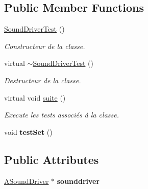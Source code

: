 \subsection*{Public Member Functions}
\begin{DoxyCompactItemize}
\item 
\mbox{\label{classtest_1_1SoundDriverTest_aad88a1409390d4e5683f01c8148cd678}} 
\hyperlink{classtest_1_1SoundDriverTest_aad88a1409390d4e5683f01c8148cd678}{Sound\+Driver\+Test} ()
\begin{DoxyCompactList}\small\item\em Constructeur de la classe. \end{DoxyCompactList}\item 
\mbox{\label{classtest_1_1SoundDriverTest_aa24bf777b917a63c718943de6adc0862}} 
virtual \hyperlink{classtest_1_1SoundDriverTest_aa24bf777b917a63c718943de6adc0862}{$\sim$\+Sound\+Driver\+Test} ()
\begin{DoxyCompactList}\small\item\em Destructeur de la classe. \end{DoxyCompactList}\item 
\mbox{\label{classtest_1_1SoundDriverTest_a2dbcff2039859116241f5d9e0a93a490}} 
virtual void \hyperlink{classtest_1_1SoundDriverTest_a2dbcff2039859116241f5d9e0a93a490}{suite} ()
\begin{DoxyCompactList}\small\item\em Execute les tests associés à la classe. \end{DoxyCompactList}\item 
\mbox{\label{classtest_1_1SoundDriverTest_a8358062aa58264dc5bbdd7f0311c1cb0}} 
void {\bfseries test\+Set} ()
\end{DoxyCompactItemize}
\subsection*{Public Attributes}
\begin{DoxyCompactItemize}
\item 
\mbox{\label{classtest_1_1SoundDriverTest_ae740fb3793043d2cfff9144a37894e00}} 
\hyperlink{classASoundDriver}{A\+Sound\+Driver} $\ast$ {\bfseries sounddriver}
\end{DoxyCompactItemize}
